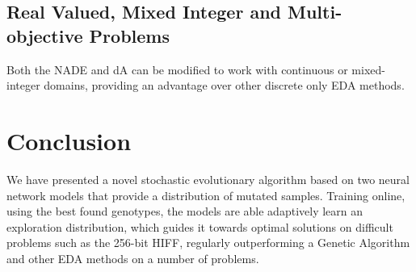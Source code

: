\documentclass[twoside]{article}
\begin{document}
\subsection{Real Valued, Mixed Integer and Multi-objective Problems}
Both the NADE and dA can be modified to work with continuous or mixed-integer domains, providing an advantage over other discrete only EDA methods.

\section{Conclusion}
We have presented a novel stochastic evolutionary algorithm based on two neural network models that provide a distribution of mutated samples. Training online, using the best found genotypes, the models are able adaptively learn an exploration distribution, which guides it towards optimal solutions on difficult problems such as the 256-bit HIFF, regularly outperforming a Genetic Algorithm and other EDA methods on a number of problems.
\small



\end{document}
